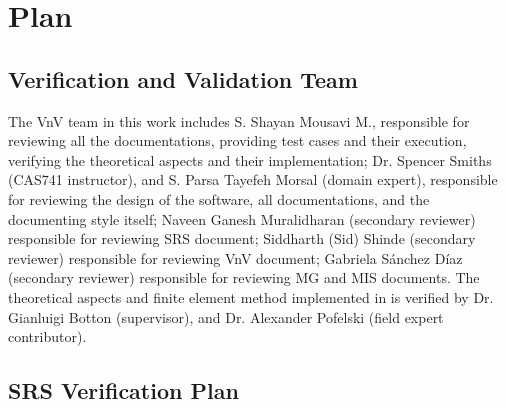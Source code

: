 \documentclass[12pt, titlepage]{article}
\begin{document}
\section{Plan}
	
\subsection{Verification and Validation Team}

The VnV team in this work includes S. Shayan Mousavi M., responsible for reviewing all the documentations, providing test cases and their execution, verifying the theoretical aspects and their implementation; Dr. Spencer Smiths (CAS741 instructor), and S. Parsa Tayefeh Morsal (domain expert), responsible for reviewing the design of the software, all documentations, and the documenting style itself; Naveen Ganesh Muralidharan (secondary reviewer) responsible for reviewing SRS document; Siddharth (Sid) Shinde (secondary reviewer) responsible for reviewing VnV document; Gabriela Sánchez Díaz (secondary reviewer) responsible for reviewing MG and MIS documents. The theoretical aspects and finite element method implemented in \progname{} is verified by Dr. Gianluigi Botton (supervisor), and Dr. Alexander Pofelski (field expert contributor).



\subsection{SRS Verification Plan}
\end{document}
